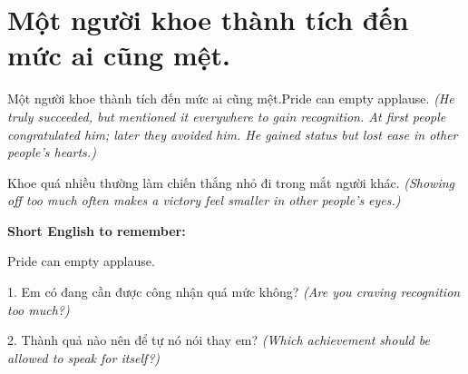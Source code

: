 \section{Một người khoe thành tích đến mức ai cũng mệt.}
\begin{truyen}{Một người khoe thành tích đến mức ai cũng mệt.}{Pride can empty applause.}
\textit{(He truly succeeded, but mentioned it everywhere to gain recognition. At first people congratulated him; later they avoided him. He gained status but lost ease in other people's hearts.)}
\end{truyen}
\begin{baihoc}
Khoe quá nhiều thường làm chiến thắng nhỏ đi trong mắt người khác.
\textit{(Showing off too much often makes a victory feel smaller in other people's eyes.)}
\end{baihoc}
\begin{ghinhoanh}\textbf{Short English to remember:}

Pride can empty applause.
\end{ghinhoanh}
\begin{tuhocnhanh}
1. Em có đang cần được công nhận quá mức không? \textit{(Are you craving recognition too much?)}

2. Thành quả nào nên để tự nó nói thay em? \textit{(Which achievement should be allowed to speak for itself?)}
\end{tuhocnhanh}
\ngancach

